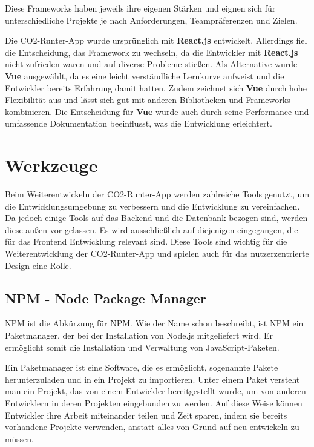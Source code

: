Diese Frameworks haben jeweils ihre eigenen Stärken und eignen sich für unterschiedliche Projekte je nach Anforderungen, Teampräferenzen und Zielen.\cite{angular-vuejs-reactjs-comparison:3, angular-vuejs-reactjs-comparison:4}

Die CO2-Runter-App wurde ursprünglich mit \textbf{React.js} entwickelt. Allerdings fiel die Entscheidung, das Framework zu wechseln, da die Entwickler mit \textbf{React.js} nicht zufrieden waren und auf diverse Probleme stießen. Als Alternative wurde \textbf{Vue} ausgewählt, da es eine leicht verständliche Lernkurve aufweist und die Entwickler bereits Erfahrung damit hatten. Zudem zeichnet sich \textbf{Vue} durch hohe Flexibilität aus und lässt sich gut mit anderen Bibliotheken und Frameworks kombinieren. Die Entscheidung für \textbf{Vue} wurde auch durch seine Performance und umfassende Dokumentation beeinflusst, was die Entwicklung erleichtert.

\section{Werkzeuge}
\label{chapter:3-werkzeuge}

Beim Weiterentwickeln der CO2-Runter-App werden zahlreiche Tools genutzt, um die Entwicklungsumgebung zu verbessern und die Entwicklung zu vereinfachen. Da jedoch einige Tools auf das Backend und die Datenbank bezogen sind, werden diese außen vor gelassen. Es wird ausschließlich auf diejenigen eingegangen, die für das Frontend Entwicklung relevant sind. Diese Tools sind wichtig für die Weiterentwicklung der CO2-Runter-App und spielen auch für das nutzerzentrierte Design eine Rolle.

\subsection{NPM - Node Package Manager}
\label{chapter:3-werkzeuge-npm}

\acs{NPM} ist die Abkürzung für \acf{NPM}. Wie der Name schon beschreibt, ist NPM ein Paketmanager, der bei der Installation von Node.js mitgeliefert wird. Er ermöglicht somit die Installation und Verwaltung von JavaScript-Paketen.

Ein Paketmanager ist eine Software, die es ermöglicht, sogenannte Pakete herunterzuladen und in ein Projekt zu importieren. Unter einem Paket versteht man ein Projekt, das von einem Entwickler bereitgestellt wurde, um von anderen Entwicklern in deren Projekten eingebunden zu werden. Auf diese Weise können Entwickler ihre Arbeit miteinander teilen und Zeit sparen, indem sie bereits vorhandene Projekte verwenden, anstatt alles von Grund auf neu entwickeln zu müssen.

